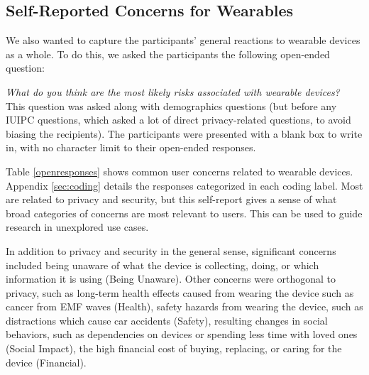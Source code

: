 \subsection{Self-Reported Concerns for Wearables}
We also wanted to capture the participants' general reactions to wearable devices as a whole. To do this, we asked the participants the following open-ended question:

\textit{What do you think are the most likely risks associated with wearable devices?}\\[-.5cm]

This question was asked along with demographics questions (but before any IUIPC questions, which asked a lot of direct privacy-related questions, to avoid biasing the recipients). The participants were presented with a blank box to write in, with no character limit to their open-ended responses. 

Table \ref{openresponses} shows common user concerns related to wearable devices. Appendix \ref{sec:coding} details the responses categorized in each coding label. Most are related to privacy and security, but this self-report gives a sense of what broad categories of concerns are most relevant to users. This can be used to guide research in unexplored use cases. 

In addition to privacy and security in the general sense, significant concerns included being unaware of what the device is collecting, doing, or which information it is using (Being Unaware). Other concerns were orthogonal to privacy, such as long-term health effects caused from wearing the device such as cancer from EMF waves (Health), safety hazards from wearing the device, such as distractions which cause car accidents (Safety), resulting changes in social behaviors, such as dependencies on devices or spending less time with loved ones (Social Impact), the high financial cost of buying, replacing, or caring for the device (Financial).

